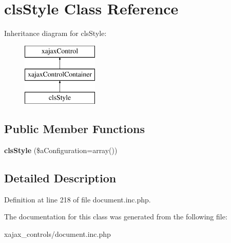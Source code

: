 \hypertarget{classclsStyle}{
\section{clsStyle Class Reference}
\label{classclsStyle}
}
Inheritance diagram for clsStyle:\begin{figure}[H]
\begin{center}
\leavevmode
\includegraphics[height=3.000000cm]{classclsStyle}
\end{center}
\end{figure}
\subsection*{Public Member Functions}
\begin{DoxyCompactItemize}
\item 
\hypertarget{classclsStyle_a889518e0aeff2b629b0a74d8e841526a}{
{\bfseries clsStyle} (\$aConfiguration=array())}
\label{classclsStyle_a889518e0aeff2b629b0a74d8e841526a}

\end{DoxyCompactItemize}


\subsection{Detailed Description}


Definition at line 218 of file document.inc.php.



The documentation for this class was generated from the following file:\begin{DoxyCompactItemize}
\item 
xajax\_\-controls/document.inc.php\end{DoxyCompactItemize}
